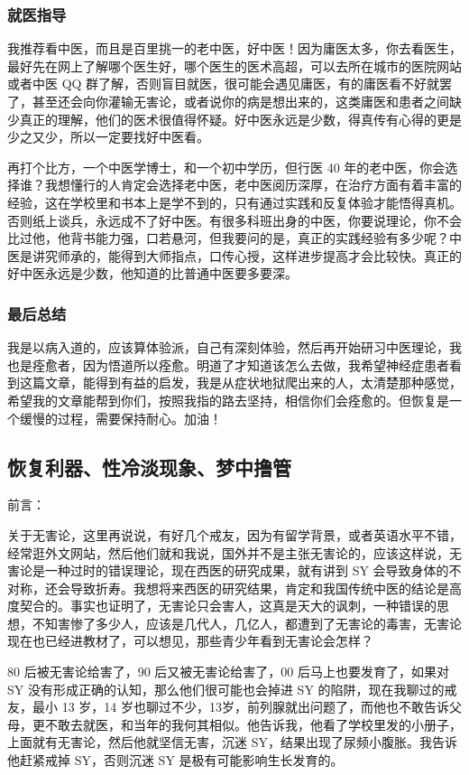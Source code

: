 \documentclass{ctexart}
\begin{document}
\subsubsection{就医指导}

我推荐看中医，而且是百里挑一的老中医，好中医！因为庸医太多，你去看医生，最好先在网上了解哪个医生好，哪个医生的医术高超，可以去所在城市的医院网站或者中医 QQ 群了解，否则盲目就医，很可能会遇见庸医，有的庸医看不好就罢了，甚至还会向你灌输无害论，或者说你的病是想出来的，这类庸医和患者之间缺少真正的理解，他们的医术很值得怀疑。好中医永远是少数，得真传有心得的更是少之又少，所以一定要找好中医看。

再打个比方，一个中医学博士，和一个初中学历，但行医 40 年的老中医，你会选择谁？我想懂行的人肯定会选择老中医，老中医阅历深厚，在治疗方面有着丰富的经验，这在学校里和书本上是学不到的，只有通过实践和反复体验才能悟得真机。否则纸上谈兵，永远成不了好中医。有很多科班出身的中医，你要说理论，你不会比过他，他背书能力强，口若悬河，但我要问的是，真正的实践经验有多少呢？中医是讲究师承的，能得到大师指点，口传心授，这样进步提高才会比较快。真正的好中医永远是少数，他知道的比普通中医要多要深。

\subsubsection{最后总结}

我是以病入道的，应该算体验派，自己有深刻体验，然后再开始研习中医理论，我也是痊愈者，因为悟道所以痊愈。明道了才知道该怎么去做，我希望神经症患者看到这篇文章，能得到有益的启发，我是从症状地狱爬出来的人，太清楚那种感觉，希望我的文章能帮到你们，按照我指的路去坚持，相信你们会痊愈的。但恢复是一个缓慢的过程，需要保持耐心。加油！

\subsection{恢复利器、性冷淡现象、梦中撸管}

前言：

关于无害论，这里再说说，有好几个戒友，因为有留学背景，或者英语水平不错，经常逛外文网站，然后他们就和我说，国外并不是主张无害论的，应该这样说，无害论是一种过时的错误理论，现在西医的研究成果，就有讲到 SY 会导致身体的不对称，还会导致折寿。我想将来西医的研究结果，肯定和我国传统中医的结论是高度契合的。事实也证明了，无害论只会害人，这真是天大的讽刺，一种错误的思想，不知害惨了多少人，应该是几代人，几亿人，都遭到了无害论的毒害，无害论现在也已经进教材了，可以想见，那些青少年看到无害论会怎样？

80 后被无害论给害了，90 后又被无害论给害了，00 后马上也要发育了，如果对 SY 没有形成正确的认知，那么他们很可能也会掉进 SY 的陷阱，现在我聊过的戒友，最小 13 岁，14 岁也聊过不少，13岁，前列腺就出问题了，而他也不敢告诉父母，更不敢去就医，和当年的我何其相似。他告诉我，他看了学校里发的小册子，上面就有无害论，然后他就坚信无害，沉迷 SY，结果出现了尿频小腹胀。我告诉他赶紧戒掉 SY，否则沉迷 SY 是极有可能影响生长发育的。
\end{document}
